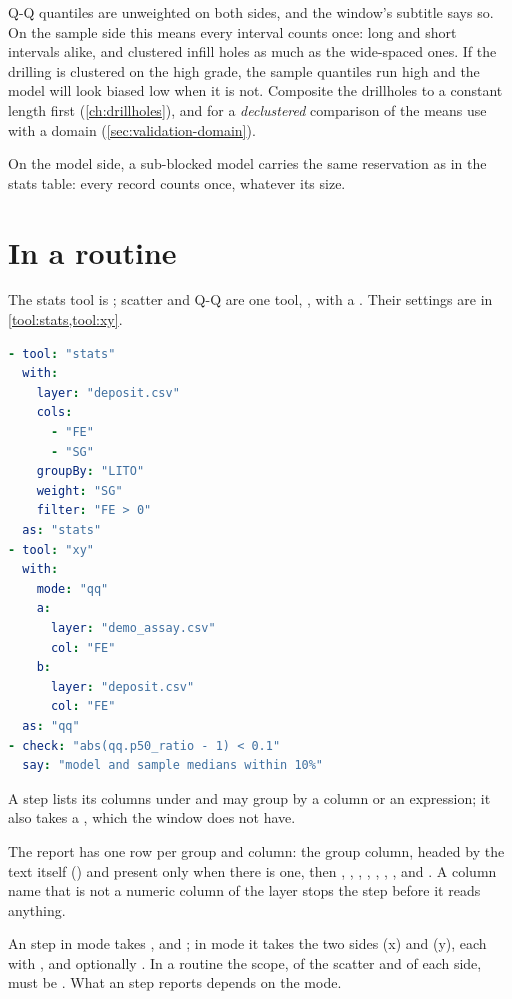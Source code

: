 \begin{caution}
Q-Q quantiles are unweighted on both sides, and the window's subtitle says so. On the sample side this means every interval counts once: long and short intervals alike, and clustered infill holes as much as the wide-spaced ones. If the drilling is clustered on the high grade, the sample quantiles run high and the model will look biased low when it is not. Composite the drillholes to a constant length first (\cref{ch:drillholes}), and for a \emph{declustered} comparison of the means use  with a domain (\cref{sec:validation-domain}).
\end{caution}

On the model side, a sub-blocked model carries the same reservation as in the stats table: every record counts once, whatever its size.

\section{In a routine}\label{sec:stats-routine}
The stats tool is ; scatter and Q-Q are one tool, , with a . Their settings are in \cref{tool:stats,tool:xy}.

\begin{lstlisting}[language=yaml]
- tool: "stats"
  with:
    layer: "deposit.csv"
    cols:
      - "FE"
      - "SG"
    groupBy: "LITO"
    weight: "SG"
    filter: "FE > 0"
  as: "stats"
- tool: "xy"
  with:
    mode: "qq"
    a:
      layer: "demo_assay.csv"
      col: "FE"
    b:
      layer: "deposit.csv"
      col: "FE"
  as: "qq"
- check: "abs(qq.p50_ratio - 1) < 0.1"
  say: "model and sample medians within 10%"
\end{lstlisting}

A  step lists its columns under  and may group by a column or an expression; it also takes a , which the window does not have.

The  report has one row per group and column: the group column, headed by the  text itself () and present only when there is one, then , , , , , , ,  and . A column name that is not a numeric column of the layer stops the step before it reads anything.

An  step in  mode takes ,  and ; in  mode it takes the two sides  (x) and  (y), each with ,  and optionally . In a routine the scope, of the scatter and of each side, must be . What an  step reports depends on the mode.

